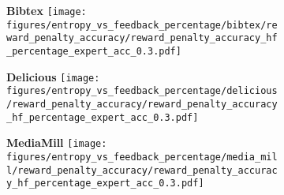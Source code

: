 \captionsetup{font=footnotesize}
\begin{figure}[t]
     \caption{Variation of expert queries made for different models based on entropy for feedback type: Reward Manipulation}
    \label{fig:app_var_entr_percentage_rm}
    \centering
    \begin{subfigure}[b]{0.32\columnwidth}
        \centering
        \setlength{\fboxsep}{1pt}\colorbox{lightgray!30}{\textbf{Bibtex}}
        \texttt{[image: figures/entropy\_vs\_feedback\_percentage/bibtex/reward\_penalty\_accuracy/reward\_penalty\_accuracy\_hf\_percentage\_expert\_acc\_0.3.pdf]}
    \end{subfigure}
    \hfill
    \begin{subfigure}[b]{0.32\columnwidth}
        \centering
        \setlength{\fboxsep}{1pt}\colorbox{lightgray!30}{\textbf{Delicious}}
        \texttt{[image: figures/entropy\_vs\_feedback\_percentage/delicious/reward\_penalty\_accuracy/reward\_penalty\_accuracy\_hf\_percentage\_expert\_acc\_0.3.pdf]}
    \end{subfigure}
    \hfill
    \begin{subfigure}[b]{0.32\columnwidth}
        \centering
        \setlength{\fboxsep}{1pt}\colorbox{lightgray!30}{\textbf{MediaMill}}
        \texttt{[image: figures/entropy\_vs\_feedback\_percentage/media\_mill/reward\_penalty\_accuracy/reward\_penalty\_accuracy\_hf\_percentage\_expert\_acc\_0.3.pdf]}
    \end{subfigure}
    \hfill
    

\end{figure}

